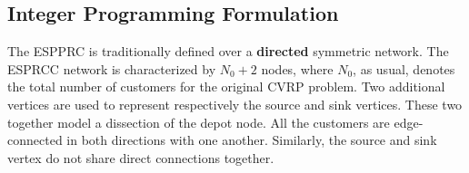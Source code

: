\begin{comment}

[MY OWN STUFF, kept for reference purpose. TODO: Merge or delete later]
\subsection{Shortest Path Problem with Resource Constraints}
If there are no negative cost cyles, e.g. when the reduced cost variables are positive $\bar{c}_{ij} \ge 0$,
the ESPPRC problem is solvable in polynomial time, since the elementarity conditions are guaranteed
to be satisfied in this case.
In this particular case, some authors have proposed efficient methods to tackle this case:
\cite{beasley1989,carlyle2008,dumitrescu2003,muhandiramge2009}.
These proposed approaches work under the assumption that no negative cost cycle is present,
and use lagrangian relaxation to relax the capacity constraints.

\subsection{Elementary Shortest Path Problem with Resource Constraints}
In the case where the network may be contain negative cost cycles, the
elementarity condition must be explicitly modeled, or relaxed, in order
to obtain reasonable dual bound solutions for the CVRP.
\textcite{feillet2004} proposes a dynamic programming algorithm where
the elementary property is handled through the usage of an additional resource
bound to each node.
\textcite{righini2006} proposes a bi-directional dynamic programming algorithm to solve the ESPPRC.
\end{comment}

\subsection{Integer Programming Formulation}
\label{sec:espprc-integer-programming-formulation}

The ESPPRC is traditionally defined over a \textbf{directed}
symmetric network.
The ESPRCC network is characterized by $N_0 + 2$ nodes,
where $N_0$, as usual, denotes the total number of customers for the original CVRP problem.
Two additional vertices are used to represent respectively the source and sink vertices.
These two together model a dissection of the depot node.
All the customers are edge-connected in both directions with one another.
Similarly, the source and sink vertex do not share direct connections together.

